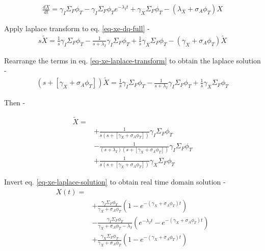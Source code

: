 \documentclass[11pt,a4paper]{article}
\begin{document}
\begin{equation} \label{eq-xe-dq-full}
\begin{gathered}
\frac{dX}{dt}=\gamma_I\Sigma_F\phi_T - \gamma_I\Sigma_F\phi_T e^{-\lambda_I t} + \gamma_X \Sigma_F \phi_T - (\lambda_X + \sigma_A \phi_T) X
\end{gathered}
\end{equation}

\noindent Apply laplace transform to eq. \ref{eq-xe-dq-full} -
\begin{equation} \label{eq-xe-laplace-transform}
\begin{gathered}
s\tilde{X}=\frac{1}{s}\gamma_I\Sigma_F\phi_T - \frac{1}{s+\lambda_I}\gamma_I\Sigma_F\phi_T + \frac{1}{s}\gamma_X\Sigma_F\phi_T - (\gamma_X+\sigma_A\phi_T)\tilde{X}
\end{gathered}
\end{equation}

\noindent Rearrange the terms in eq. \ref{eq-xe-laplace-transform} to obtain the laplace solution - 
\begin{equation}
\begin{gathered}
(s+[\gamma_X+\sigma_A\phi_T])\tilde{X}=\frac{1}{s}\gamma_I\Sigma_F\phi_T - \frac{1}{s+\lambda_I}\gamma_I\Sigma_F\phi_T + \frac{1}{s}\gamma_X\Sigma_F\phi_T
\end{gathered}
\end{equation}

\noindent Then - 

\begin{equation} \label{eq-xe-laplace-solution} 
\begin{aligned}
\tilde{X}=\\
& +\frac{1}{s(s+[\gamma_X+\sigma_A\phi_T])}\gamma_I\Sigma_F\phi_T \\
& -\frac{1}{(s+\lambda_I)(s+[\gamma_X+\sigma_A\phi_T])}\gamma_I\Sigma_F\phi_T \\
& +\frac{1}{s(s+[\gamma_X+\sigma_A\phi_T])}\gamma_X\Sigma_F\phi_T
\end{aligned}
\end{equation}

\noindent Invert eq. \ref{eq-xe-laplace-solution} to obtain real time domain solution - 
\begin{equation} \label{eq-xe-solution} 
\begin{aligned}
X(t)=\\
& +\frac{\gamma_I\Sigma_F\phi_T}{\gamma_X+\sigma_A\phi_T}(1-e^{-(\gamma_X+\sigma_A\phi_T)t}) \\
& -\frac{\gamma_I\Sigma_F\phi_T}{\gamma_X+\sigma_A\phi_T-\lambda_I}(e^{-\lambda_I t}-e^{-(\gamma_X+\sigma_A\phi_T)t}) \\
& +\frac{\gamma_X\Sigma_F\phi_T}{\gamma_X+\sigma_A\phi_T}(1-e^{-(\gamma_X+\sigma_A\phi_T)t}) \\
\end{aligned}
\end{equation}
\end{document}
